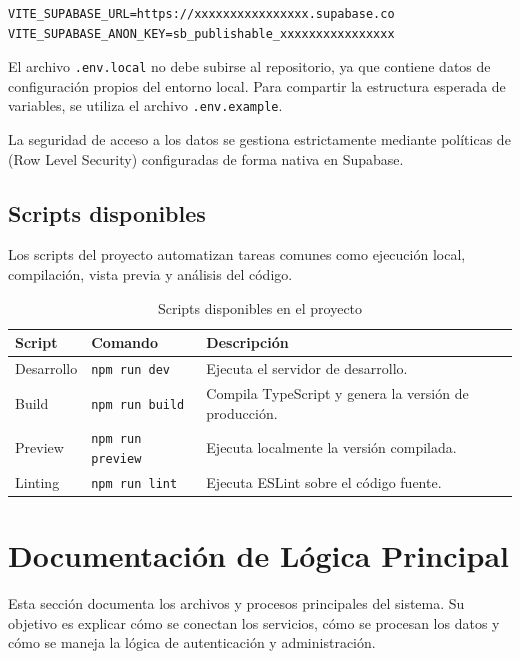 \documentclass[12pt,letterpaper]{article}
\newcommand{\code}[1]{\nolinkurl{#1}}
\begin{document}
\begin{lstlisting}[language={}]
VITE_SUPABASE_URL=https://xxxxxxxxxxxxxxxx.supabase.co
VITE_SUPABASE_ANON_KEY=sb_publishable_xxxxxxxxxxxxxxxx
\end{lstlisting}

El archivo \code{.env.local} no debe subirse al repositorio, ya que contiene datos de configuración propios del entorno local. Para compartir la estructura esperada de variables, se utiliza el archivo \code{.env.example}.

La seguridad de acceso a los datos se gestiona estrictamente mediante políticas de (Row Level Security) configuradas de forma nativa en Supabase.

\subsection{Scripts disponibles}

Los scripts del proyecto automatizan tareas comunes como ejecución local, compilación, vista previa y análisis del código.

\begin{longtable}{|p{}|p{}|p{}|}
\caption{Scripts disponibles en el proyecto}\\
\hline
\textbf{Script} & \textbf{Comando} & \textbf{Descripción} \\
\hline
Desarrollo & \code{npm run dev} & Ejecuta el servidor de desarrollo. \\
\hline
Build & \code{npm run build} & Compila TypeScript y genera la versión de producción. \\
\hline
Preview & \code{npm run preview} & Ejecuta localmente la versión compilada. \\
\hline
Linting & \code{npm run lint} & Ejecuta ESLint sobre el código fuente. \\
\hline
\end{longtable}

\section{Documentación de Lógica Principal}

Esta sección documenta los archivos y procesos principales del sistema. Su objetivo es explicar cómo se conectan los servicios, cómo se procesan los datos y cómo se maneja la lógica de autenticación y administración.
\end{document}
